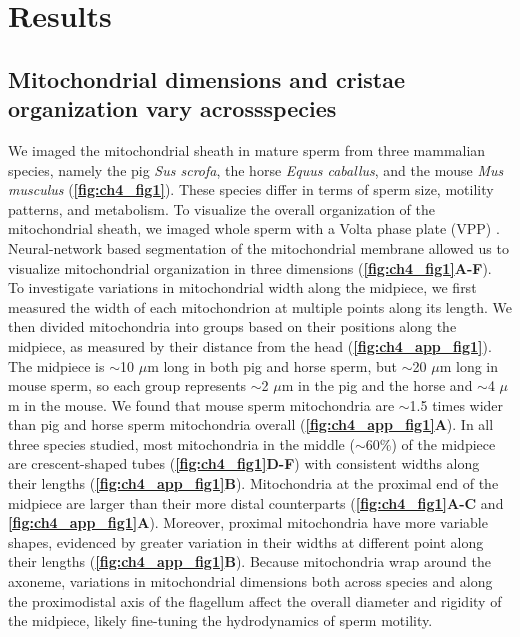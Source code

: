 \section{Results}
\subsection*{Mitochondrial dimensions and cristae organization vary across\linebreak species}
We imaged the mitochondrial sheath in mature sperm from three mammalian species, namely the pig \emph{Sus scrofa}, the horse \emph{Equus caballus}, and the mouse \emph{Mus musculus} (\textbf{\autoref{fig:ch4_fig1}}). These species differ in terms of sperm size, motility patterns, and metabolism. To visualize the overall organization of the mitochondrial sheath, we imaged whole sperm with a Volta phase plate (VPP) \cite{Fukuda2015, Danev2014}. Neural-network based segmentation \cite{Chen2017b} of the mitochondrial membrane allowed us to visualize mitochondrial organization in three dimensions (\textbf{\autoref{fig:ch4_fig1}A-F}). To investigate variations in mitochondrial width along the midpiece, we first measured the width of each mitochondrion at multiple points along its length. We then divided mitochondria into groups based on their positions along the midpiece, as measured by their distance from the head (\textbf{\autoref{fig:ch4_app_fig1}}). The midpiece is $\sim$10 $\mu$m long in both pig and horse sperm, but $\sim$20 $\mu$m long in mouse sperm, so each group represents $\sim$2 $\mu$m in the pig and the horse and $\sim$4 $\mu$m in the mouse. We found that mouse sperm mitochondria are $\sim$1.5 times wider than pig and horse sperm mitochondria overall (\textbf{\autoref{fig:ch4_app_fig1}A}). In all three species studied, most mitochondria in the middle ($\sim$60\%) of the midpiece are crescent-shaped tubes (\textbf{\autoref{fig:ch4_fig1}D-F}) with consistent widths along their lengths (\textbf{\autoref{fig:ch4_app_fig1}B}). Mitochondria at the proximal end of the midpiece are larger than their more distal counterparts (\textbf{\autoref{fig:ch4_fig1}A-C} and \textbf{\autoref{fig:ch4_app_fig1}A}). Moreover, proximal mitochondria have more variable shapes, evidenced by greater variation in their widths at different point along their lengths (\textbf{\autoref{fig:ch4_app_fig1}B}). Because mitochondria wrap around the axoneme, variations in mitochondrial dimensions both across species and along the proximodistal axis of the flagellum affect the overall diameter and rigidity of the midpiece, likely fine-tuning the hydrodynamics of sperm motility.
